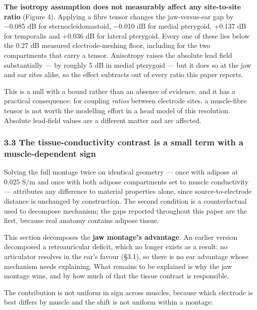 \documentclass[
  11pt,
]{article}
\begin{document}
\textbf{The isotropy assumption does not measurably affect any site-to-site ratio}
(Figure 4).
Applying a fibre tensor changes the jaw-versus-ear gap by −0.085 dB for
sternocleidomastoid, −0.010 dB for medial pterygoid, +0.137 dB for temporalis
and +0.036 dB for lateral pterygoid. Every one of these lies below the 0.27 dB
measured electrode-meshing floor, including for the two compartments that
carry a tensor. Anisotropy raises the absolute lead field substantially --- by
roughly 5 dB in medial pterygoid --- but it does so at the jaw and ear sites
alike, so the effect subtracts out of every ratio this paper reports.

This is a null with a bound rather than an absence of evidence, and it has a
practical consequence: for coupling \emph{ratios} between electrode sites, a
muscle-fibre tensor is not worth the modelling effort in a head model of this
resolution. Absolute lead-field values are a different matter and are affected.

\subsubsection{3.3 The tissue-conductivity contrast is a small term with a muscle-dependent sign}\label{the-tissue-conductivity-contrast-is-a-small-term-with-a-muscle-dependent-sign}

Solving the full montage twice on identical geometry --- once with adipose at
0.025 S/m and once with both adipose compartments set to muscle conductivity ---
attributes any difference to material properties alone, since source-to-electrode
distance is unchanged by construction. The second condition is a counterfactual
used to decompose mechanism; the gaps reported throughout this paper are the
first, because real anatomy contains adipose tissue.

This section decomposes the \textbf{jaw montage's advantage}. An earlier version
decomposed a retroauricular deficit, which no longer exists as a result: no
articulator resolves in the ear's favour (§3.1), so there is no ear advantage
whose mechanism needs explaining. What remains to be explained is why the jaw
montage wins, and by how much of that the tissue contrast is responsible.

The contribution is not uniform in sign across muscles, because which electrode
is best differs by muscle and the shift is not uniform within a montage:
\end{document}
